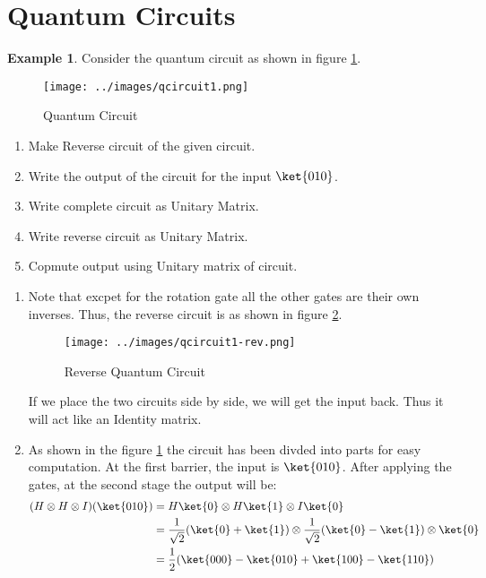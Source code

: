 \documentclass[12pt, oneside]{book}
\theoremstyle{definition}
\theoremstyle{definition}
\newtheorem{example}{Example}[section]
\theoremstyle{remark}
\begin{document}
\section{Quantum Circuits}
\begin{example}
    Consider the quantum circuit as shown in figure \ref{fig:qcircuit1}.
    \begin{figure}[H]
        \centering
        \texttt{[image: ../images/qcircuit1.png]}
        \caption{Quantum Circuit}
        \label{fig:qcircuit1}
    \end{figure}
    \begin{enumerate}
        \item Make Reverse circuit of the given circuit.
        \item Write the output of the circuit for the input $\ket{010}$.
        \item Write complete circuit as Unitary Matrix.
        \item Write reverse circuit as Unitary Matrix.
        \item Copmute output using Unitary matrix of circuit.
    \end{enumerate}
    \begin{enumerate}
        \item Note that excpet for the rotation gate all the other gates are their own inverses. Thus, the reverse circuit is as shown in figure \ref{fig:qcircuit1-rev}.
        \begin{figure}[H]
            \centering
            \texttt{[image: ../images/qcircuit1-rev.png]}
            \caption{Reverse Quantum Circuit}
            \label{fig:qcircuit1-rev}
        \end{figure}
        If we place the two circuits side by side, we will get the input back. Thus it will act like an Identity matrix.
        \item As shown in the figure \ref{fig:qcircuit1} the circuit has been divded into parts for easy computation. At the first barrier, the input is $\ket{010}$.
        After applying the gates, at the second stage the output will be:
        \begin{align*}
            (H \otimes H \otimes I)(\ket{010})&=H\ket{0} \otimes H\ket{1}\otimes I\ket{0}\\
            &=\frac{1}{\sqrt{2}}(\ket{0}+\ket{1})\otimes\frac{1}{\sqrt{2}}(\ket{0}-\ket{1})\otimes\ket{0}\\
            &=\frac{1}{2}(\ket{000}-\ket{010}+\ket{100}-\ket{110})

\end{align*}
\end{enumerate}
\end{example}
\end{document}
